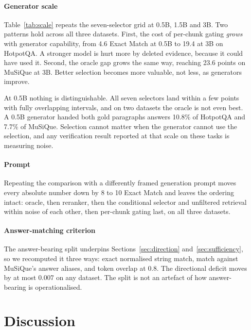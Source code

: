 \documentclass[conference]{IEEEtran}
\begin{document}
\paragraph{Generator scale}
Table~\ref{tab:scale} repeats the seven-selector grid at 0.5B, 1.5B and 3B. Two
patterns hold across all three datasets. First, the cost of per-chunk gating
\emph{grows} with generator capability, from 4.6 Exact Match at 0.5B to 19.4 at
3B on HotpotQA. A stronger model is hurt more by deleted evidence, because it
could have used it. Second, the oracle gap grows the same way, reaching 23.6
points on MuSiQue at 3B. Better selection becomes more valuable, not less, as
generators improve.

At 0.5B nothing is distinguishable. All seven selectors land within a few points
with fully overlapping intervals, and on two datasets the oracle is not even
best. A 0.5B generator handed both gold paragraphs answers 10.8\% of HotpotQA
and 7.7\% of MuSiQue. Selection cannot matter when the generator cannot use the
selection, and any verification result reported at that scale on these tasks is
measuring noise.

\paragraph{Prompt}
Repeating the comparison with a differently framed generation prompt moves every
absolute number down by 8 to 10 Exact Match and leaves the ordering intact:
oracle, then reranker, then the conditional selector and unfiltered retrieval
within noise of each other, then per-chunk gating last, on all three datasets.

\paragraph{Answer-matching criterion}
The answer-bearing split underpins Sections~\ref{sec:direction}
and~\ref{sec:sufficiency}, so we recomputed it three ways: exact normalised
string match, match against MuSiQue's answer aliases, and token overlap at 0.8.
The directional deficit moves by at most 0.007 on any dataset. The split is not
an artefact of how answer-bearing is operationalised.

\section{Discussion}
\label{sec:discussion}
\end{document}
